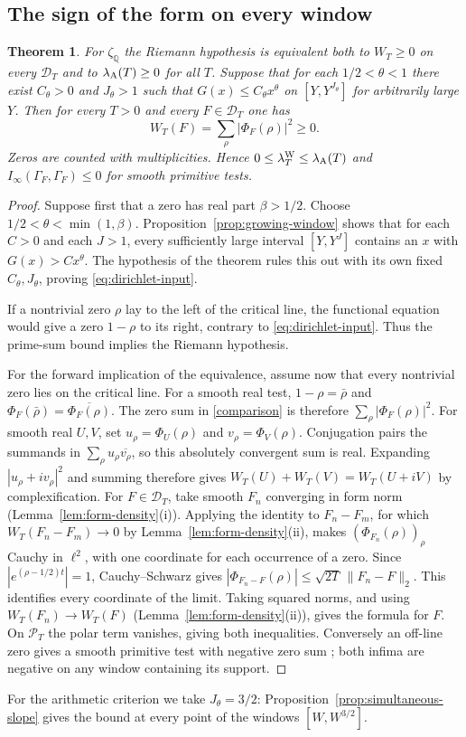 \documentclass[10pt]{amsart}
\newtheorem{theorem}{Theorem}[section]
\theoremstyle{definition}
\theoremstyle{remark}
\begin{document}
\subsection*{The sign of the form on every window}
\begin{theorem}\label{thm:all-support}
For $\zeta_{\mathbb Q}$ the Riemann hypothesis is equivalent both to
$W_T\ge0$ on every $\mathcal D_T$ and to $\lambda_{\rm A}(T)\ge0$ for all $T$.
Suppose that for each $1/2<\theta<1$ there exist $C_\theta>0$
and $J_\theta>1$ such that $G(x)\le C_\theta x^\theta$ on
$[Y,Y^{J_\theta}]$ for arbitrarily large $Y$. Then for every
$T>0$ and every $F\in\mathcal D_T$ one has
\[
 W_T(F)=\sum_{\rho}|\Phi_F(\rho)|^2\ge0 .
\]
Zeros are counted with multiplicities. Hence
$0\le\lambda^{\rm W}_T\le\lambda_{\rm A}(T)$ and
$I_\infty(\Gamma_F,\Gamma_F)\le0$ for smooth primitive tests.
\end{theorem}
\begin{proof}
Suppose first that a zero has real part $\beta>1/2$. Choose
$1/2<\theta<\min(1,\beta)$. Proposition~\ref{prop:growing-window}
shows that for each $C>0$ and each $J>1$, every sufficiently large
interval $[Y,Y^J]$ contains an $x$ with $G(x)>Cx^\theta$.
The hypothesis of the theorem rules this out with its own fixed
$C_\theta,J_\theta$, proving \eqref{eq:dirichlet-input}.

If a nontrivial zero $\rho$ lay to the left of the critical line,
the functional equation would give a zero $1-\rho$ to its right,
contrary to \eqref{eq:dirichlet-input}. Thus the prime-sum bound
implies the Riemann hypothesis.

For the forward implication of the equivalence, assume now that every
nontrivial zero lies on the critical line. For a smooth real test,
$1-\rho=\bar\rho$ and $\Phi_F(\bar\rho)=\overline{\Phi_F(\rho)}$.
The zero sum in \eqref{comparison} is therefore
$\sum_\rho |\Phi_F(\rho)|^2$.
For smooth real $U,V$, set $u_\rho=\Phi_U(\rho)$ and
$v_\rho=\Phi_V(\rho)$. Conjugation pairs the summands in
$\sum_\rho u_\rho\overline{v_\rho}$, so this absolutely convergent
sum is real. Expanding $|u_\rho+i v_\rho|^2$ and summing therefore
gives $W_T(U)+W_T(V)=W_T(U+iV)$ by complexification.
For $F\in\mathcal D_T$, take smooth $F_n$ converging in form norm
(Lemma~\ref{lem:form-density}(i)). Applying the identity to $F_n-F_m$,
for which $W_T(F_n-F_m)\to0$ by Lemma~\ref{lem:form-density}(ii),
makes $(\Phi_{F_n}(\rho))_\rho$ Cauchy in $\ell^2$, with one
coordinate for each occurrence of a zero. Since
$|e^{(\rho-1/2)t}|=1$, Cauchy--Schwarz gives
$|\Phi_{F_n-F}(\rho)|\le\sqrt{2T}\,\|F_n-F\|_2$.
This identifies every coordinate of the limit. Taking squared norms,
and using $W_T(F_n)\to W_T(F)$ (Lemma~\ref{lem:form-density}(ii)),
gives the formula for $F$. On $\mathcal P_T$ the polar term
vanishes, giving both inequalities. Conversely an off-line zero gives
a smooth primitive test with negative zero sum
\cite[Theorem~6.2]{Paper45}; both infima are negative on any window
containing its support.
\end{proof}
For the arithmetic criterion we take $J_\theta=3/2$:
Proposition~\ref{prop:simultaneous-slope} gives the bound at every point of
the windows $[W,W^{3/2}]$.
\end{document}
